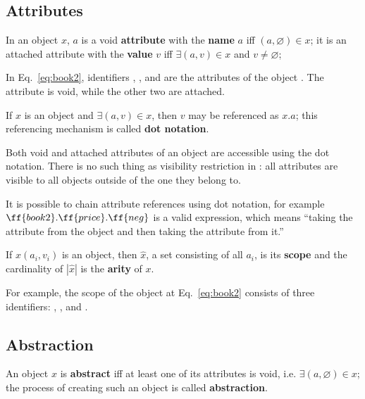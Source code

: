 \subsection{Attributes}

\begin{definition}\label{def:attribute}
In an object \(x\), \(a\) is a void \textbf{attribute}
with the \textbf{name} \(a\)
iff \((a, \varnothing) \in x\); it is an attached attribute
with the \textbf{value} \(v\)
iff \(\exists (a, v)\in x\) and \(v\not=\varnothing\);
\end{definition}

In Eq.~\ref{eq:book2}, identifiers , , and 
are the attributes of the object .
The attribute  is void, while the other two are attached.

\begin{definition}\label{def:dot}
If \(x\) is an object and \(\exists (a, v) \in x\), then \(v\) may be referenced as \(x.a\);
this referencing mechanism is called \textbf{dot notation}.
\end{definition}

Both void and attached attributes of an object are accessible using
the dot notation. There is no such thing as
visibility restriction in \phic{}:
all attributes are visible to all objects outside of the one they belong to.

It is possible to chain attribute references using dot notation, for example
\(\ff{book2}.\ff{price}.\ff{neg}\) is a valid expression, which means
``taking the attribute  from the object  and then
taking the attribute  from it.''

\begin{definition}\label{def:scope}
If \(x(a_i, v_i)\) is an object, then \(\hat{x}\), a set consisting of all \(a_i\),
is its \textbf{scope} and the cardinality of \(|\hat{x}|\) is
the \textbf{arity} of \(x\).
\end{definition}

For example, the scope of the object at Eq.~\ref{eq:book2} consists of three identifiers:
, , and .

\subsection{Abstraction}

\begin{definition}\label{def:abstraction}
An object \(x\) is \textbf{abstract} iff at least one of its attributes is void,
i.e. \(\exists (a, \varnothing)\in x\);
the process of creating such an object is called \textbf{abstraction}.
\end{definition}

